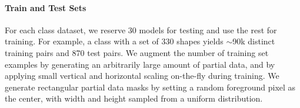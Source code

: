 \documentclass[acmtog,timestamp]{acmart}%
\begin{document}
\begin{comment}
Figure~\ref{fig:instace_examples} features a small subset of silhouette instances that serve as input to \ourmethod{}.

\begin{figure}[h]
\begin{tabular}{ c c }
\texttt{[image: figures/sample\_data/H\_samples25.png]} &
\texttt{[image: figures/sample\_data/airplane\_samples25.png]} \\
uppercase H & airplane \\
\end{tabular}
\caption{A small random subset of rendered silhouettes: displaying instances of shape data from two different classes.}
\label{fig:instace_examples}
\end{figure}
\end{comment}\paragraph{Train and Test Sets}
For each class dataset, we reserve 30 models for testing and use the rest for training. For example, a class with a set of 330 shapes yields $\sim$90k distinct training pairs and 870 test pairs. We augment the number of training set examples by generating an arbitrarily large amount of partial data, and by applying small vertical and horizontal scaling on-the-fly during training. We generate rectangular partial data masks by setting a random foreground pixel as the center, with width and height sampled from a uniform distribution. 
\end{document}
